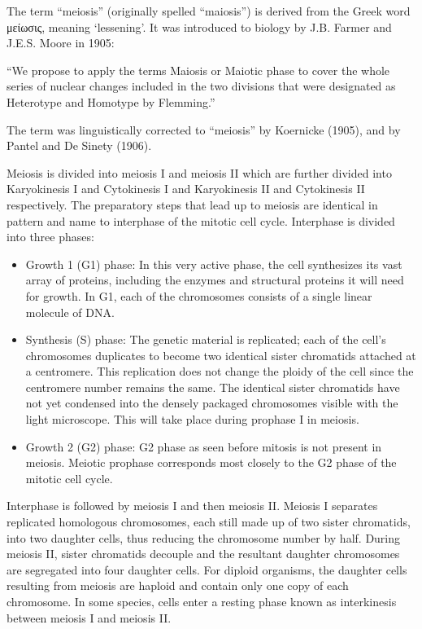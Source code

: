 The term ``meiosis'' (originally spelled ``maiosis'') is derived from the Greek word μείωσις, meaning `lessening'. It was introduced to biology by J.B. Farmer and J.E.S. Moore in 1905:

``We propose to apply the terms Maiosis or Maiotic phase to cover the whole series of nuclear changes included in the two divisions that were designated as Heterotype and Homotype by Flemming.''

The term was linguistically corrected to ``meiosis'' by Koernicke (1905), and by Pantel and De Sinety (1906).

Meiosis is divided into meiosis I and meiosis II which are further divided into Karyokinesis I and Cytokinesis I and Karyokinesis II and Cytokinesis II respectively. The preparatory steps that lead up to meiosis are identical in pattern and name to interphase of the mitotic cell cycle. Interphase is divided into three phases:

\begin{itemize}
\tightlist
\item
  Growth 1 (G1) phase: In this very active phase, the cell synthesizes its vast array of proteins, including the enzymes and structural proteins it will need for growth. In G1, each of the chromosomes consists of a single linear molecule of DNA.
\item
  Synthesis (S) phase: The genetic material is replicated; each of the cell's chromosomes duplicates to become two identical sister chromatids attached at a centromere. This replication does not change the ploidy of the cell since the centromere number remains the same. The identical sister chromatids have not yet condensed into the densely packaged chromosomes visible with the light microscope. This will take place during prophase I in meiosis.
\item
  Growth 2 (G2) phase: G2 phase as seen before mitosis is not present in meiosis. Meiotic prophase corresponds most closely to the G2 phase of the mitotic cell cycle.
\end{itemize}

Interphase is followed by meiosis I and then meiosis II. Meiosis I separates replicated homologous chromosomes, each still made up of two sister chromatids, into two daughter cells, thus reducing the chromosome number by half. During meiosis II, sister chromatids decouple and the resultant daughter chromosomes are segregated into four daughter cells. For diploid organisms, the daughter cells resulting from meiosis are haploid and contain only one copy of each chromosome. In some species, cells enter a resting phase known as interkinesis between meiosis I and meiosis II.


